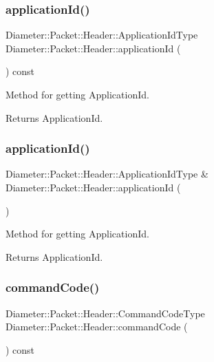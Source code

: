 \subsubsection{\texorpdfstring{application\+Id()}{applicationId()}\hspace{0.1cm}{\footnotesize\ttfamily [1/2]}}
{\footnotesize\ttfamily Diameter\+::\+Packet\+::\+Header\+::\+Application\+Id\+Type Diameter\+::\+Packet\+::\+Header\+::application\+Id (\begin{DoxyParamCaption}{ }\end{DoxyParamCaption}) const}



Method for getting Application\+Id. 

\begin{DoxyReturn}{Returns}
Application\+Id. 
\end{DoxyReturn}
\mbox{\label{classDiameter_1_1Packet_1_1Header_a3dcde95d29bb35f44787a83ca314ea97}} 
\subsubsection{\texorpdfstring{application\+Id()}{applicationId()}\hspace{0.1cm}{\footnotesize\ttfamily [2/2]}}
{\footnotesize\ttfamily Diameter\+::\+Packet\+::\+Header\+::\+Application\+Id\+Type \& Diameter\+::\+Packet\+::\+Header\+::application\+Id (\begin{DoxyParamCaption}{ }\end{DoxyParamCaption})}



Method for getting Application\+Id. 

\begin{DoxyReturn}{Returns}
Application\+Id. 
\end{DoxyReturn}
\mbox{\label{classDiameter_1_1Packet_1_1Header_a8e281f7c949efdb737d1b6d8e96a0a97}} 
\subsubsection{\texorpdfstring{command\+Code()}{commandCode()}\hspace{0.1cm}{\footnotesize\ttfamily [1/2]}}
{\footnotesize\ttfamily Diameter\+::\+Packet\+::\+Header\+::\+Command\+Code\+Type Diameter\+::\+Packet\+::\+Header\+::command\+Code (\begin{DoxyParamCaption}{ }\end{DoxyParamCaption}) const}



